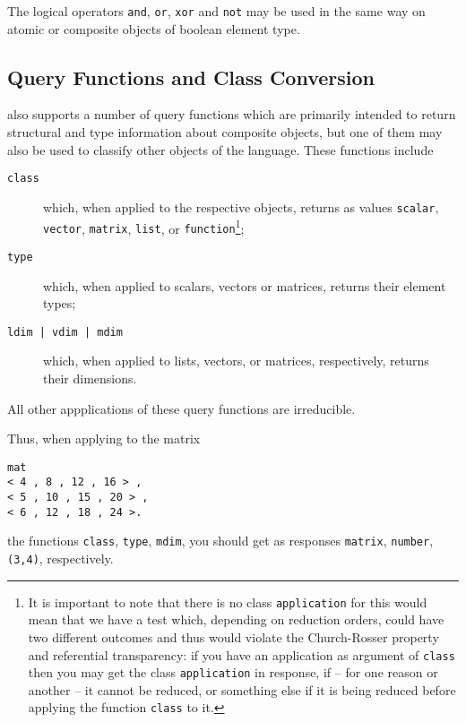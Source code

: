 The {\mys logical operators} {\tt and}, {\tt or}, {\tt xor}
and {\tt not} may be used in the same way on atomic
or composite objects of boolean element type.

\subsection{Query Functions and Class Conversion}
\kir also supports a number of {\mys query functions} which
are primarily intended to return {\mys structural} and {\mys type
information} about composite objects, but one of them may also
be used to classify other objects of the language. These 
functions include
\begin{description}
\item[{\tt class}] which, when applied to the respective \kir
objects, returns as values {\tt scalar}, {\tt vector}, {\tt matrix}, {\tt list}, or {\tt function}\footnote{It is important to note that
there is no class {\tt application} for this would mean that we 
have a test which, depending on reduction orders, could have
two different outcomes and thus would violate the Church-Rosser
property and referential transparency: if you have an application
as argument of {\tt class} then you may get the class {\tt application} in response, if -- for one reason or another -- it cannot be
reduced, or something else if it is being reduced before applying
the function {\tt class} to it.};
\item[{\tt type}] which, when applied to  scalars, vectors or matrices, returns their element types;
\item[{\tt ldim | vdim | mdim}] which, when applied to lists, vectors, or matrices, respectively, returns their dimensions.
\end{description}
All other appplications of these query functions are irreducible.

Thus, when applying to the matrix
\begin{verbatim} 
mat 
< 4 , 8 , 12 , 16 > ,
< 5 , 10 , 15 , 20 > ,
< 6 , 12 , 18 , 24 >.
\end{verbatim}
the functions {\tt class}, {\tt type}, {\tt mdim}, you
should get as responses {\tt matrix}, {\tt number}, {\tt (3,4)},
respectively. 

